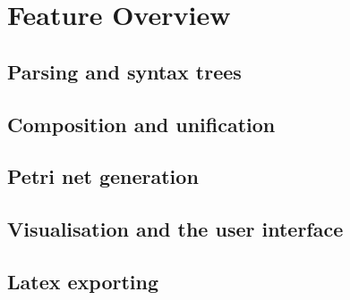 \documentclass[../Dissertation.tex]{subfiles}
\begin{document}
\section{Feature Overview}
\subsection{Parsing and syntax trees}
\subsection{Composition and unification}
\subsection{Petri net generation}
\subsection{Visualisation and the user interface}
\subsection{Latex exporting}
\end{document}
